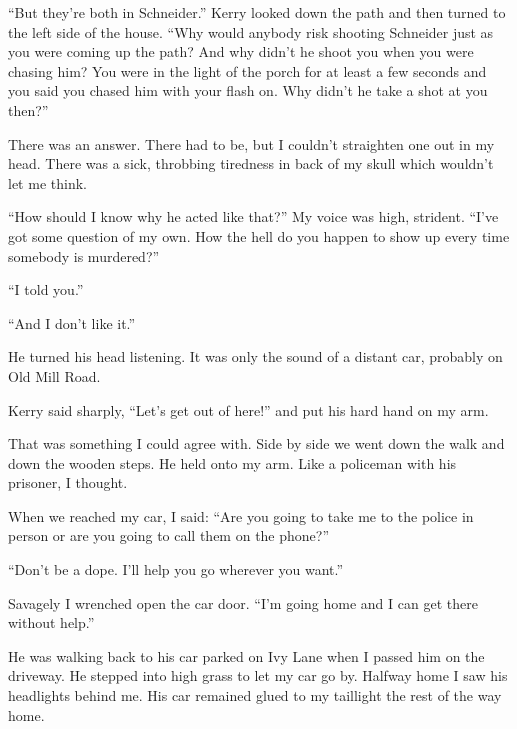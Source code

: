 \documentclass{novel}
\begin{document}
{“But they’re both in Schneider.” Kerry looked down the path and then turned to the left side of the house. “Why would anybody risk shooting Schneider just as you were coming up the path? And why didn’t he shoot you when you were chasing him? You were in the light of the porch for at least a few seconds and you said you chased him with your flash on. Why didn’t he take a shot at you then?”

There was an answer. There had to be, but I couldn’t straighten one out in my head. There was a sick, throbbing tiredness in back of my skull which wouldn’t let me think.

“How should I know why he acted like that?” My voice was high, strident. “I’ve got some question of my own. How the hell do you happen to show up every time somebody is murdered?”

“I told you.”

“And I don’t like it.”

He turned his head listening. It was only the sound of a distant car, probably on Old Mill Road.

Kerry said sharply, “Let’s get out of here!” and put his hard hand on my arm.

That was something I could agree with. Side by side we went down the walk and down the wooden steps. He held onto my arm. Like a policeman with his prisoner, I thought.

When we reached my car, I said: “Are you going to take me to the police in person or are you going to call them on the phone?”

“Don’t be a dope. I’ll help you go wherever you want.”

Savagely I wrenched open the car door. “I’m going home and I can get there without help.”

He was walking back to his car parked on Ivy Lane when I passed him on the driveway. He stepped into high grass to let my car go by. Halfway home I saw his headlights behind me. His car remained glued to my taillight the rest of the way home.

}

\vspace{2\nbs}
\clearpage
\thispagestyle{empty}
\end{document}
